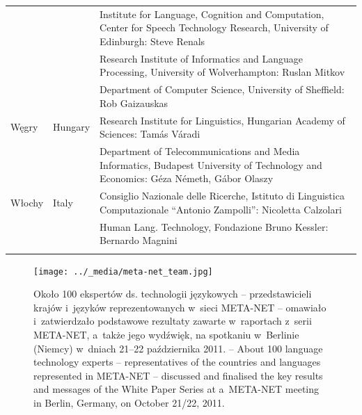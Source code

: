 \begin{longtable}{llp{115mm}}
\addlinespace & & Institute for Language, Cognition and Computation,
Center for Speech Technology Research, University of Edinburgh: Steve
Renals\\
\addlinespace & & Research Institute of Informatics and Language
Processing, University of Wolverhampton: Ruslan Mitkov\\
\addlinespace && Department of Computer Science, University of
Sheffield: Rob Gaizauskas\\
\addlinespace Węgry & \textcolor{grey1}{Hungary} & Research Institute
for Linguistics, Hungarian Academy of Sciences: Tamás Váradi\\
\addlinespace & & Department of Telecommunications and Media
Informatics, Budapest University of Technology and Economics: Géza
Németh, Gábor Olaszy\\
\addlinespace Włochy & \textcolor{grey1}{Italy} & Consiglio Nazionale
delle Ricerche, Istituto di Linguistica Computazionale \newline
“Antonio Zampolli”: Nicoletta Calzolari\\
\addlinespace & & Human Lang. Technology, Fondazione Bruno Kessler:
Bernardo Magnini\\
\addlinespace \end{longtable} \normalsize 

\renewcommand*{\figureformat}{} \renewcommand*{\captionformat}{} 

\begin{figure}[htb]  \center
\texttt{[image: ../\_media/meta-net\_team.jpg]}
\caption{Około 100 ekspertów ds. technologii językowych --
przedstawicieli krajów i~języków reprezentowanych w~sieci META-NET
-- omawiało i~zatwierdzało podstawowe rezultaty zawarte w~raportach
z~serii META-NET, a~także jego wydźwięk, na spotkaniu w~Berlinie
(Niemcy) w~dniach 21--22 października 2011. --
\textcolor{grey1}{About 100 language technology experts --
representatives of the countries and languages represented in META-NET
-- discussed and finalised the key results and messages of the White
Paper Series at a~META-NET meeting in Berlin, Germany, on October
21/22, 2011.}} \medskip {}
\end{figure} 

\cleardoublepage 

 \label{whitepaperseries} 

